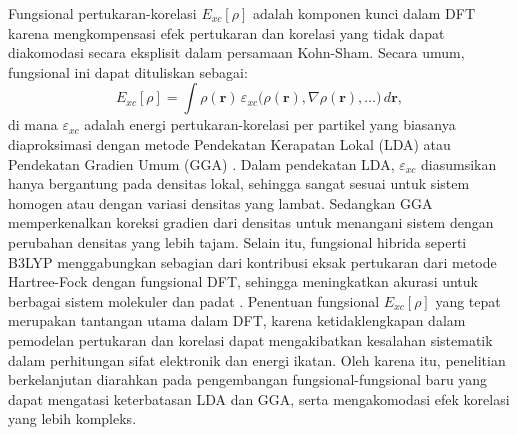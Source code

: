 Fungsional pertukaran-korelasi \(E_{xc}[\rho]\) adalah komponen kunci dalam DFT karena mengkompensasi efek pertukaran dan korelasi yang tidak dapat diakomodasi secara eksplisit dalam persamaan Kohn-Sham.
Secara umum, fungsional ini dapat dituliskan sebagai:
\begin{equation}
    E_{xc}[\rho] = \int \rho(\mathbf{r})\,\varepsilon_{xc}\Big(\rho(\mathbf{r}), \nabla\rho(\mathbf{r}), \ldots\Big) \, d\mathbf{r},
\end{equation}
di mana \(\varepsilon_{xc}\) adalah energi pertukaran-korelasi per partikel yang biasanya diaproksimasi dengan metode Pendekatan Kerapatan Lokal (LDA) atau Pendekatan Gradien Umum (GGA) \citep{Perdew1996}.
Dalam pendekatan LDA, \(\varepsilon_{xc}\) diasumsikan hanya bergantung pada densitas lokal, sehingga sangat sesuai untuk sistem homogen atau dengan variasi densitas yang lambat.
Sedangkan GGA memperkenalkan koreksi gradien dari densitas untuk menangani sistem dengan perubahan densitas yang lebih tajam.
Selain itu, fungsional hibrida seperti B3LYP menggabungkan sebagian dari kontribusi eksak pertukaran dari metode Hartree-Fock dengan fungsional DFT, sehingga meningkatkan akurasi untuk berbagai sistem molekuler dan padat \citep{Becke1993}.
Penentuan fungsional \(E_{xc}[\rho]\) yang tepat merupakan tantangan utama dalam DFT, karena ketidaklengkapan dalam pemodelan pertukaran dan korelasi dapat mengakibatkan kesalahan sistematik dalam perhitungan sifat elektronik dan energi ikatan.
Oleh karena itu, penelitian berkelanjutan diarahkan pada pengembangan fungsional-fungsional baru yang dapat mengatasi keterbatasan LDA dan GGA, serta mengakomodasi efek korelasi yang lebih kompleks.

